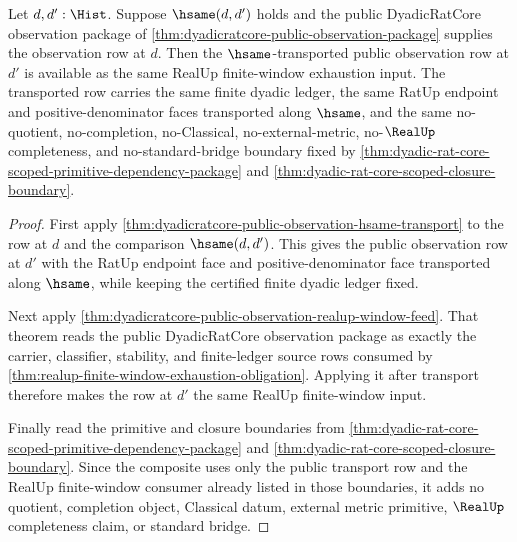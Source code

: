 \begin{theorem}
\label{thm:dyadicratcore-public-observation-hsame-transport-bridge}
Let $d,d':\Hist$. Suppose $\hsame(d,d')$ holds and the public DyadicRatCore
observation package of
\autoref{thm:dyadicratcore-public-observation-package} supplies the observation
row at $d$. Then the $\hsame$-transported public observation row at $d'$ is
available as the same RealUp finite-window exhaustion input. The transported
row carries the same finite dyadic ledger, the same RatUp endpoint and
positive-denominator faces transported along $\hsame$, and the same
no-quotient, no-completion, no-Classical, no-external-metric, no-$\RealUp$
completeness, and no-standard-bridge boundary fixed by
\autoref{thm:dyadic-rat-core-scoped-primitive-dependency-package} and
\autoref{thm:dyadic-rat-core-scoped-closure-boundary}.
\end{theorem}
\begin{proof}
First apply
\autoref{thm:dyadicratcore-public-observation-hsame-transport} to the row at
$d$ and the comparison $\hsame(d,d')$. This gives the public observation row at
$d'$ with the RatUp endpoint face and positive-denominator face transported
along $\hsame$, while keeping the certified finite dyadic ledger fixed.

Next apply \autoref{thm:dyadicratcore-public-observation-realup-window-feed}.
That theorem reads the public DyadicRatCore observation package as exactly the
carrier, classifier, stability, and finite-ledger source rows consumed by
\autoref{thm:realup-finite-window-exhaustion-obligation}. Applying it after
transport therefore makes the row at $d'$ the same RealUp finite-window input.

Finally read the primitive and closure boundaries from
\autoref{thm:dyadic-rat-core-scoped-primitive-dependency-package} and
\autoref{thm:dyadic-rat-core-scoped-closure-boundary}. Since the composite uses
only the public transport row and the RealUp finite-window consumer already
listed in those boundaries, it adds no quotient, completion object, Classical
datum, external metric primitive, $\RealUp$ completeness claim, or standard
bridge.
\end{proof}

